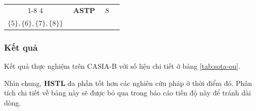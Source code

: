 \begin{enumerate}
\begin{table}[bt]
{\begin{tabular}{c|ccccc|c|c}
                      \cline{1-8}      4                                           & \multicolumn{5}{c|}{\textbf{ASTP}}                     & 8                                                & \makecell[c]{$\{\{1\},\{2\},\{3\},\{4\},$                                                                                                                                                     \\$\{5\},\{6\},\{7\},\{8\}\}$} \\
                      \bottomrule\end{tabular}%
              }
              \label{tab:pcb-str}%
          \end{table}%


\end{enumerate}


\subsubsection{Kết quả}

Kết quả thực nghiệm trên CASIA-B với số liệu chi tiết ở bảng \ref{tab:sota-ou}.

Nhìn chung, \textbf{HSTL} đa phần tốt hơn các nghiên cứu pháp ở thời điểm đó. Phân tích chi tiết về bảng này sẽ được bỏ qua trong báo cáo tiến độ này để tránh dài dòng.

